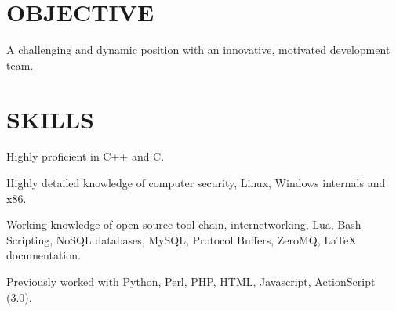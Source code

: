 \documentclass[margin]{res}
\begin{document}
 
 

\address{david.andrews112@gmail.com \ \ \ (949) 633-0588}


 
\begin{resume}  

\section{OBJECTIVE}
A challenging and dynamic position with an innovative, motivated development team.


\section{SKILLS}
\begin{list}{}{\leftmargin=0em \topsep=0pt \partopsep=0pt \parsep=2.5pt}
  \item Highly proficient in C++ and C.
  \item Highly detailed knowledge of computer security, Linux, Windows internals and x86.
  \item Working knowledge of open-source tool chain, internetworking,
    Lua, Bash Scripting, NoSQL databases, MySQL, Protocol Buffers,
    ZeroMQ, \LaTeX{} documentation.
  \item Previously worked with Python, Perl, PHP, HTML, Javascript, ActionScript (3.0).
\end{list}






\end{resume}
\end{document}

